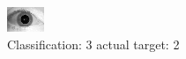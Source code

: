 \begin{figure}[h!]
\begin{center}
\includegraphics[width=0.60\columnwidth]{figures/ID1711_class_3_target_2.png}
\end{center}
\caption{ Classification: 3 actual target: 2}
\label{fig:ID1711_class_3_target_2}
\end{figure}
